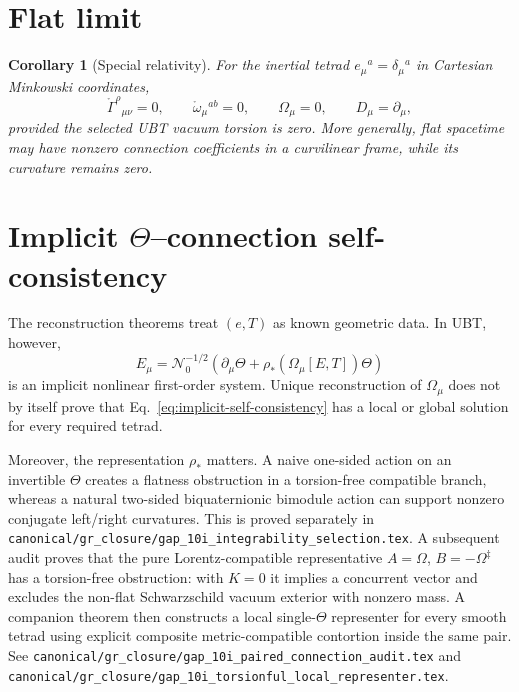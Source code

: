 \documentclass[12pt,a4paper]{article}
\newtheorem{corollary}[definition]{Corollary}
\theoremstyle{remark}\newtheorem{remark}[definition]{Remark}
\begin{document}
\section{Flat limit}
\begin{corollary}[Special relativity]
For the inertial tetrad $e_\mu{}^a=\delta_\mu{}^a$ in Cartesian Minkowski
coordinates,
\begin{equation}
 \mathring\Gamma^\rho{}_{\mu\nu}=0,
 \qquad \mathring\omega_\mu{}^{ab}=0,
 \qquad \Omega_\mu=0,
 \qquad D_\mu=\partial_\mu,
\end{equation}
provided the selected UBT vacuum torsion is zero.  More generally, flat
spacetime may have nonzero connection coefficients in a curvilinear frame,
while its curvature remains zero.
\end{corollary}

\section{Implicit $\Theta$--connection self-consistency}
The reconstruction theorems treat $(e,T)$ as known geometric data.  In UBT,
however,
\begin{equation}
 E_\mu=\mathcal N_0^{-1/2}
 \left(\partial_\mu\Theta+\rho_*(\Omega_\mu[E,T])\Theta\right)
 \label{eq:implicit-self-consistency}
\end{equation}
is an implicit nonlinear first-order system.  Unique reconstruction of
$\Omega_\mu$ does not by itself prove that
Eq.~\eqref{eq:implicit-self-consistency} has a local or global solution for
every required tetrad.

Moreover, the representation $\rho_*$ matters.  A naive one-sided action on an
invertible $\Theta$ creates a flatness obstruction in a torsion-free compatible
branch, whereas a natural two-sided biquaternionic bimodule action can support
nonzero conjugate left/right curvatures.  This is proved separately in
\texttt{canonical/gr\_closure/gap\_10i\_integrability\_selection.tex}.
A subsequent audit proves that the pure Lorentz-compatible representative
$A=\Omega$, $B=-\Omega^\ddagger$ has a torsion-free obstruction: with $K=0$
it implies a concurrent vector and excludes the non-flat Schwarzschild vacuum
exterior with nonzero mass.  A companion theorem then constructs a local
single-$\Theta$ representer for every smooth tetrad using explicit composite
metric-compatible contortion inside the same pair.  See
\texttt{canonical/gr\_closure/gap\_10i\_paired\_connection\_audit.tex} and
\texttt{canonical/gr\_closure/gap\_10i\_torsionful\_local\_representer.tex}.
\end{document}
